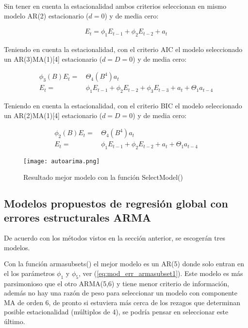 \documentclass[11pt, letterpaper, twoside]{article}
\begin{document}
Sin tener en cuenta la estacionalidad ambos criterios seleccionan en mismo modelo AR(2) estacionario ($d=0$) y de media cero:

\begin{align}
\label{eq:mod_err_autoarima}
    E_t = \phi_1 E_{t-1} + \phi_2 E_{t-2} + a_t
\end{align}

Teniendo en cuenta la estacionalidad, con el criterio AIC el modelo seleccionado un AR(3)MA(1)[4] estacionario ($d=D=0$) y de media cero:

\begin{align}
\label{eq:mod_err_autoarimas1}
    \phi_3(B) E_t = &\, \Theta_4(B^4) a_t \\
    E_t = &\, \phi_1 E_{t-1} + \phi_2 E_{t-2} + \phi_3 E_{t-3} + a_t + \Theta_1 a_{t-4} \nonumber
\end{align}

Teniendo en cuenta la estacionalidad, con el criterio BIC el modelo seleccionado un AR(2)MA(1)[4] estacionario ($d=D=0$) y de media cero:

\begin{align}
\label{eq:mod_err_autoarimas2}
    \phi_2(B) E_t = &\, \Theta_4(B^4) a_t \\
    E_t = &\, \phi_1 E_{t-1} + \phi_2 E_{t-2} + a_t + \Theta_1 a_{t-4} \nonumber
\end{align}

\begin{figure}[ht!]
\centering
\texttt{[image: autoarima.png]}
\caption{Resultado mejor modelo con la función SelectModel()}
\label{fig:autoarima}
\end{figure}

\subsection{Modelos propuestos de regresión global con errores estructurales ARMA}

De acuerdo con los métodos vistos en la sección anterior, se escogerán tres modelos.

Con la función armasubsets() el mejor modelo es un AR(5) donde solo entran en el los parámetros $\phi_1$ y $\phi_5$, ver (\ref{eq:mod_err_armasubset1}). Este modelo es más parsimonioso que el otro ARMA(5,6) y tiene menor criterio de información, además no hay una razón de peso para seleccionar un modelo con componente MA de orden 6, de pronto si estuviera más cerca de los rezagos que determinan posible estacionalidad (múltiplos de 4), se podría pensar en seleccionar este último.
\end{document}
